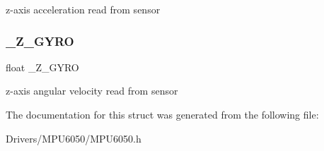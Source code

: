 z-\/axis acceleration read from sensor \mbox{\label{struct_m_p_u6050___handle_type_def_a4bd3509d1890263e62ecfd5d3932187b}} 
\subsubsection{\texorpdfstring{\+\_\+\+Z\+\_\+\+G\+Y\+RO}{\_Z\_GYRO}}
{\footnotesize\ttfamily float \+\_\+\+Z\+\_\+\+G\+Y\+RO}

z-\/axis angular velocity read from sensor 

The documentation for this struct was generated from the following file\+:\begin{DoxyCompactItemize}
\item 
Drivers/\+M\+P\+U6050/M\+P\+U6050.\+h\end{DoxyCompactItemize}
